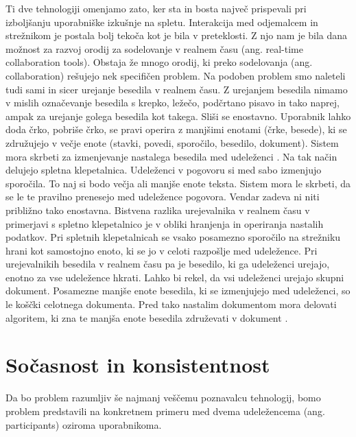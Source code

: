 \documentclass[a4paper, 12pt, twoside]{book}
\begin{document}
Ti dve tehnologiji omenjamo zato, ker sta in bosta največ prispevali pri izboljšanju uporabniške izkušnje na spletu. Interakcija med odjemalcem in strežnikom je postala bolj tekoča kot je bila v preteklosti. Z njo nam je bila dana možnost za razvoj orodij za sodelovanje v realnem času (ang. real-time collaboration tools). Obstaja že mnogo orodij, ki preko sodelovanja (ang. collaboration) rešujejo nek specifičen problem. Na podoben problem smo naleteli tudi sami in sicer urejanje besedila v realnem času. Z urejanjem besedila nimamo v mislih označevanje besedila s krepko, ležečo, podčrtano pisavo in tako naprej, ampak za urejanje golega besedila kot takega. Sliši se enostavno. Uporabnik lahko doda črko, pobriše črko, se pravi operira z manjšimi enotami (črke, besede), ki se združujejo v večje enote (stavki, povedi, sporočilo, besedilo, dokument). Sistem mora skrbeti za izmenjevanje nastalega besedila med udeleženci \cite{gdocs23}. Na tak način delujejo spletna klepetalnica. Udeleženci v pogovoru si med sabo izmenjujo sporočila. To naj si bodo večja ali manjše enote teksta. Sistem mora le skrbeti, da se le te pravilno prenesejo med udeležence pogovora. Vendar zadeva ni niti približno tako enostavna. Bistvena razlika urejevalnika v realnem času v primerjavi s spletno klepetalnico je v obliki hranjenja in operiranja nastalih podatkov. Pri spletnih klepetalnicah se vsako posamezno sporočilo na strežniku hrani kot samostojno enoto, ki se jo v celoti razpošlje med udeležence. Pri urejevalnikih besedila v realnem času pa je besedilo, ki ga udeleženci urejajo, enotno za vse udeležence hkrati. Lahko bi rekel, da vsi udeleženci urejajo skupni dokument. Posamezne manjše enote besedila, ki se izmenjujejo med udeleženci, so le koščki celotnega dokumenta. Pred tako nastalim dokumentom mora delovati algoritem, ki zna te manjša enote besedila združevati v dokument \cite{gdocs22}.

\section{Sočasnost in konsistentnost}

Da bo problem razumljiv še najmanj veščemu poznavalcu tehnologij, bomo problem predstavili na konkretnem primeru \cite{problem} med dvema udeležencema (ang. participants) oziroma uporabnikoma.
\end{document}
